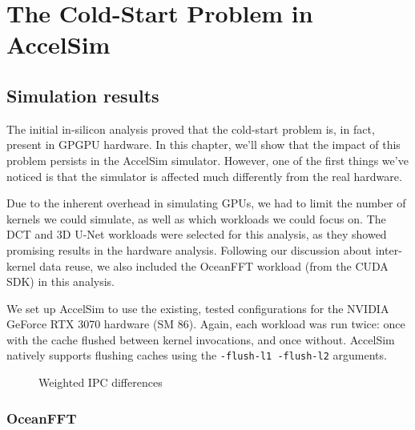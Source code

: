 \chapter{The Cold-Start Problem in AccelSim}\label{ch:sim-analysis}

\section{Simulation results}\label{sec:simulation-results}
The initial in-silicon analysis proved that the cold-start problem is, in fact, present in GPGPU hardware.
In this chapter, we'll show that the impact of this problem persists in the AccelSim simulator.
However, one of the first things we've noticed is that the simulator is affected much differently from the real hardware.

Due to the inherent overhead in simulating GPUs, we had to limit the number of kernels we could simulate, as well as which workloads we could focus on.
The DCT and 3D U-Net workloads were selected for this analysis, as they showed promising results in the hardware analysis.
Following our discussion about inter-kernel data reuse, we also included the OceanFFT workload (from the CUDA SDK) in this analysis.

We set up AccelSim to use the existing, tested configurations for the NVIDIA GeForce RTX 3070 hardware (SM 86). %
Again, each workload was run twice: once with the cache flushed between kernel invocations, and once without.
AccelSim natively supports flushing caches using the \verb|-flush-l1 -flush-l2| arguments.

\begin{figure}[ht]
    \centering
    \begin{minipage}[c]{0.45\textwidth}
        \resizebox{\textwidth}{!}{}
    \end{minipage}
    \begin{minipage}[c]{0.45\textwidth}
        \resizebox{\textwidth}{!}{}
    \end{minipage}
    \caption{Weighted IPC differences}
    \label{fig:sim_ipc_diff}
\end{figure}

\FloatBarrier
\subsection{OceanFFT}\label{subsec:oceanfft}

